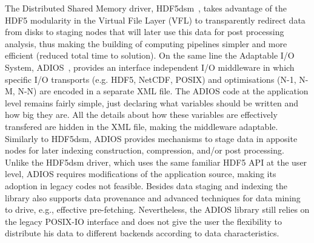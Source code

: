 \documentclass{../../template/esiwace-report}
\begin{document}
The Distributed Shared Memory driver, HDF5dsm~\cite{soumagne:hal-00652816}, takes advantage of the HDF5 modularity in the Virtual File Layer (VFL) to transparently redirect data from disks to staging nodes that will later use this data for post processing analysis, thus making the building of computing pipelines simpler and more efficient (reduced total time to solution). On the same line the Adaptable I/O System, ADIOS~\cite{Liu:2014:HAC:2768261.2768267}, provides an interface independent I/O middleware in which specific I/O transports (e.g. HDF5, NetCDF, POSIX) and optimisations (N-1, N-M, N-N) are encoded in a separate XML file. The ADIOS code at the application level remains fairly simple, just declaring what variables should be written and how big they are. All the details about how these variables are effectively transfered are hidden in the XML file, making the middleware adaptable. Similarly to HDF5dsm, ADIOS provides mechanisms to stage data in apposite nodes for later indexing construction, compression, and/or post processing. Unlike the HDF5dsm driver, which uses the same familiar HDF5 API at the user level, ADIOS requires modifications of the application source, making its adoption in legacy codes not feasible. Besides data staging and indexing the library also supports data provenance and advanced techniques for data mining to drive, e.g., effective pre-fetching. Nevertheless, the ADIOS library still relies on the legacy POSIX-IO interface and does not give the user the flexibility to distribute his data to different backends according to data characteristics.
\end{document}
